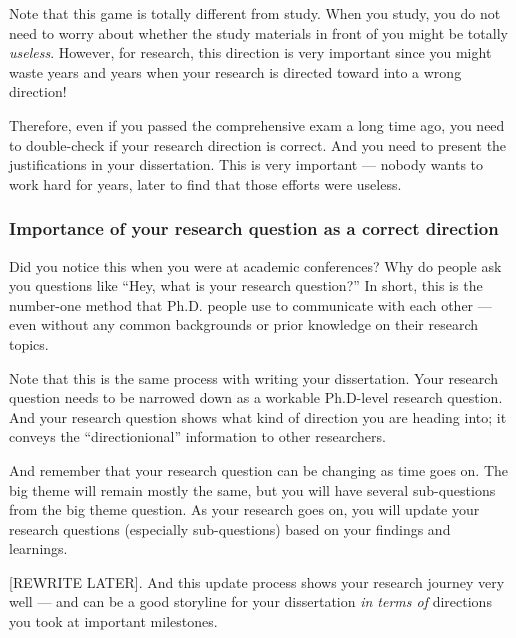 \documentclass[11pt]{article}
\begin{document}
Note that this game is totally different from study. When you study, you do
not need to worry about whether the study materials in front of you might be
totally \emph{useless}. However, for research, this direction is very
important since you might waste years and years when your research is directed
toward into a wrong direction!

Therefore, even if you passed the comprehensive exam a long time ago, you need
to double-check if your research direction is correct. And you need to present
the justifications in your dissertation. This is very important --- nobody
wants to work hard for years, later to find that those efforts were useless. 


\subsubsection{Importance of your research question as a correct direction}

Did you notice this when you were at academic conferences? Why do people ask
you questions like ``Hey, what is your research question?'' In short, this is
the number-one method that Ph.D. people use to communicate with each other ---
even without any common backgrounds or prior knowledge on their research
topics.

Note that this is the same process with writing your dissertation.  Your
research question needs to be narrowed down as a workable Ph.D-level research
question. And your research question shows what kind of direction you are
heading into; it conveys the ``directionional'' information to other researchers.

And remember that your research question can be changing as time goes on. The
big theme will remain mostly the same, but you will have several sub-questions
from the big theme question. As your research goes on, you will update your
research questions (especially sub-questions) based on your findings and
learnings. 

[REWRITE LATER]. And this update process shows your research journey very well
--- and can be a good storyline for your dissertation \emph{in terms of}
directions you took at important milestones. 
\end{document}
